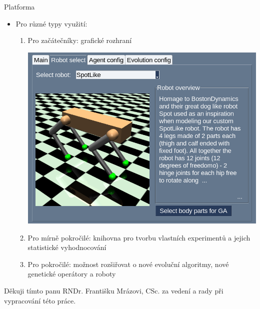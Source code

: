\documentclass[portrait,a0paper,fontscale=0.25]{baposter}
\begin{document}
\begin{poster}
\begin{posterbox}[column=0, name=newsomething2, below=something1]{Platforma}
\begin{itemize}[leftmargin=*]
    \item Pro různé typy využití:
    \vspace{-4px}
    \begin{enumerate}
        \item Pro začátečníky: grafické rozhraní
\begin{center}
\includegraphics[width=0.7\linewidth]{../../BP/img/GUI_robot_tab_spot.jpg}
\end{center}
        \item Pro mírně pokročilé: knihovna pro tvorbu vlastních experimentů a
            jejich statistické vyhodnocování
        \item Pro pokročilé: možnost rozšiřovat o nové evoluční algoritmy, nové
            genetické operátory a roboty
    \end{enumerate}
\end{itemize}
\end{posterbox}




%
%

\begin{posterbox}[column=0, span=2, name=footer, below=newsomething2,
	textborder=none, headerborder=none, boxheaderheight=0pt,
	boxColorOne=black!3]{}
\small
Děkuji tímto panu RNDr. Františku Mrázovi, CSc. za vedení a rady při
vypracování této práce.
\end{posterbox}


\end{poster}
\end{document}
